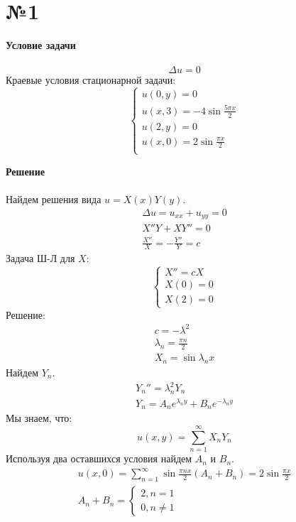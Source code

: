 \documentclass[11pt]{article}
\newenvironment{me}{
  \begin{equation}
    \begin{gathered}
      }{
    \end{gathered}
  \end{equation}
}
\newenvironment{ce}{
  \begin{equation}
    \begin{cases}
      }{
    \end{cases}
  \end{equation}
}
\begin{document}
\raggedright
\begin{sloppypar}
\section*{№1}
  \textbf{Условие задачи} \\~\\
  \begin{equation}
    \Delta u = 0
  \end{equation}
  Краевые условия стационарной задачи:
    \begin{ce}
        u(0, y) = 0 \\
        u(x, 3) = -4 \sin \frac{5\pi x}{2} \\
        u(2, y) = 0 \\
        u(x, 0) = 2 \sin \frac{\pi x}{2} \\
    \end{ce}
    
  \textbf{Решение} \\~\\
  Найдем решения вида $u = X(x)Y(y)$.
  \begin{me}
      \Delta u = u_{xx} + u_{yy} = 0 \\
      X''Y + XY'' = 0 \\
      \frac{X''}{X} = - \frac{Y''}{Y} = c
  \end{me}
  Задача Ш-Л для $X$:
  \begin{ce}
      X'' = cX \\
      X(0) = 0 \\
      X(2) = 0
  \end{ce}
  Решение:
  \begin{me}
      c = - \lambda^2 \\
      \lambda_n = \frac{\pi n}{2} \\
      X_n = \sin{\lambda_n x}
  \end{me}
  Найдем $Y_n$.
  \begin{me}
      Y_n'' = \lambda_n^2 Y_n \\
      Y_n = A_n e^{\lambda_n y} + B_n e^{- \lambda_n y}
  \end{me}
  Мы знаем, что:
  \begin{equation}
    u(x, y) = \sum_{n = 1}^\infty X_n Y_n
  \end{equation}
  Используя два оставшихся условия найдем $A_n$ и $B_n$.
  \begin{equation}
    \begin{gathered}
      u(x, 0) = \sum_{n = 1}^\infty \sin{\frac{\pi n x}{2}} (A_n + B_n) = 2\sin{\frac{\pi x}{2}} \\
      A_n + B_n = 
        \begin{cases}
          2, n = 1 \\
          0, n \neq 1
        \end{cases}
    \end{gathered}
  \end{equation}
  

\end{sloppypar}
\end{document}

